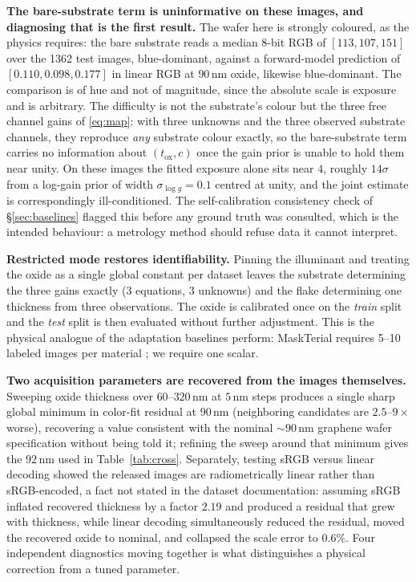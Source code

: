 \documentclass[10pt]{article}
\begin{document}
\textbf{The bare-substrate term is uninformative on these images, and diagnosing that is the first result.} The wafer here is strongly coloured, as the physics requires: the bare substrate reads a median 8-bit RGB of $[113,107,151]$ over the 1362 test images, blue-dominant, against a forward-model prediction of $[0.110,0.098,0.177]$ in linear RGB at $90$\,nm oxide, likewise blue-dominant. The comparison is of hue and not of magnitude, since the absolute scale is exposure and is arbitrary. The difficulty is not the substrate's colour but the three free channel gains of \eqref{eq:map}: with three unknowns and the three observed substrate channels, they reproduce \emph{any} substrate colour exactly, so the bare-substrate term carries no information about $(t_{\mathrm{ox}}, c)$ once the gain prior is unable to hold them near unity. On these images the fitted exposure alone sits near $4$, roughly $14\sigma$ from a log-gain prior of width $\sigma_{\log g}{=}0.1$ centred at unity, and the joint estimate is correspondingly ill-conditioned. The self-calibration consistency check of \S\ref{sec:baselines} flagged this before any ground truth was consulted, which is the intended behaviour: a metrology method should refuse data it cannot interpret.

\textbf{Restricted mode restores identifiability.} Pinning the illuminant and treating the oxide as a single global constant per dataset leaves the substrate determining the three gains exactly ($3$ equations, $3$ unknowns) and the flake determining one thickness from three observations. The oxide is calibrated once on the \emph{train} split and the \emph{test} split is then evaluated without further adjustment. This is the physical analogue of the adaptation baselines perform: MaskTerial requires 5--10 labeled images per material \cite{uslu2024maskterial}; we require one scalar.

\textbf{Two acquisition parameters are recovered from the images themselves.} Sweeping oxide thickness over $60$--$320$\,nm at $5$\,nm steps produces a single sharp global minimum in color-fit residual at $90$\,nm (neighboring candidates are $2.5$--$9\times$ worse), recovering a value consistent with the nominal ${\sim}90$\,nm graphene wafer specification without being told it; refining the sweep around that minimum gives the $92$\,nm used in Table~\ref{tab:cross}. Separately, testing sRGB versus linear decoding showed the released images are radiometrically linear rather than sRGB-encoded, a fact not stated in the dataset documentation: assuming sRGB inflated recovered thickness by a factor $2.19$ and produced a residual that grew with thickness, while linear decoding simultaneously reduced the residual, moved the recovered oxide to nominal, and collapsed the scale error to $0.6\%$. Four independent diagnostics moving together is what distinguishes a physical correction from a tuned parameter.
\end{document}
